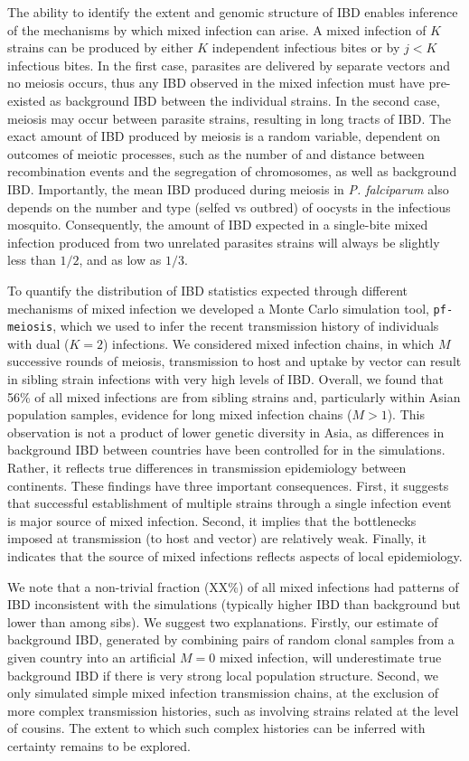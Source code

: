 \documentclass[9pt,lineno]{elife}
\begin{document}
The ability to identify the extent and genomic structure of IBD enables inference of the mechanisms by which mixed infection can arise.  A mixed infection of $K$ strains can be produced by either $K$ independent infectious bites or by $j < K$ infectious bites. In the first case, parasites are delivered by separate vectors and no meiosis occurs, thus any IBD observed in the mixed infection must have pre-existed as background IBD between the individual strains.  In the second case, meiosis may occur between parasite strains, resulting in long tracts of IBD.  The exact amount of IBD produced by meiosis is a random variable, dependent on outcomes of meiotic processes, such as the number of and distance between recombination events and the segregation of chromosomes, as well as background IBD.  Importantly, the mean IBD produced during meiosis in \textit{P. falciparum} also depends on the number and type (selfed vs outbred) of oocysts in the infectious mosquito.  Consequently, the amount of IBD expected in a single-bite mixed infection produced from two unrelated parasites strains will always be slightly less than $1/2$, and as low as $1/3$.

To quantify the distribution of IBD statistics expected through different mechanisms of mixed infection we developed a Monte Carlo simulation tool, \texttt{pf-meiosis}, which we used to infer the recent transmission history of  individuals with dual ($K=2$) infections.  We considered mixed infection chains, in which $M$ successive rounds of meiosis, transmission to host and uptake by vector can result in sibling strain infections with very high levels of IBD.  Overall, we found that 56\% of all mixed infections are from sibling strains and, particularly within Asian population samples, evidence for long mixed infection chains ($M>1$).  This observation is not a product of lower genetic diversity in Asia, as differences in background IBD between countries have been controlled for in the simulations. Rather, it reflects true differences in transmission epidemiology between continents. These findings have three important consequences.  First, it suggests that successful establishment of multiple strains through a single infection event is major source of mixed infection.  Second, it implies that the bottlenecks imposed at transmission (to host and vector) are relatively weak.  Finally, it indicates that the source of mixed infections reflects aspects of local epidemiology.

We note that a non-trivial fraction (XX\%) of all mixed infections had patterns of IBD inconsistent with the simulations (typically higher IBD than background but lower than among sibs).  We suggest two explanations.  Firstly, our estimate of background IBD, generated by combining pairs of random clonal samples from a given country into an artificial $M=0$ mixed infection, will underestimate true background IBD if there is very strong local population structure.  Second, we only simulated simple mixed infection transmission chains, at the exclusion of more complex transmission histories, such as involving strains related at the level of cousins. The extent to which such complex histories can be inferred with certainty remains to be explored.
\end{document}
